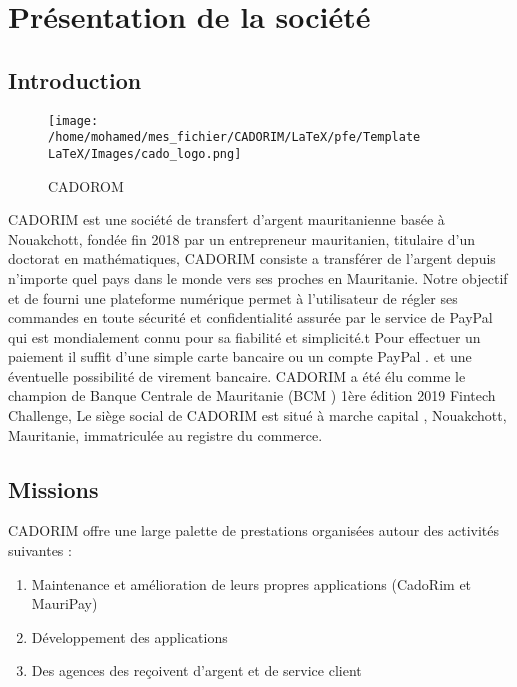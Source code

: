 	\chapter{Présentation de la société}
\label{chap:introduction}
\section{Introduction}
\begin{figure}[h]
	\texttt{[image: /home/mohamed/mes\_fichier/CADORIM/LaTeX/pfe/Template LaTeX/Images/cado\_logo.png]}
	\centering
	\caption{CADOROM}
\end{figure}
CADORIM est une société de transfert d’argent mauritanienne basée à Nouakchott,
fondée fin 2018 par un entrepreneur mauritanien, titulaire d'un doctorat en
mathématiques,
CADORIM consiste a transférer de l’argent depuis n’importe quel pays dans le
monde vers ses proches en Mauritanie. Notre objectif et de fourni une plateforme
numérique permet à l’utilisateur de régler ses commandes en toute sécurité et
confidentialité assurée par le service de PayPal qui est mondialement connu pour sa
fiabilité et simplicité.t Pour effectuer un paiement il suffit d'une simple carte bancaire
ou un compte PayPal . et une éventuelle possibilité de virement bancaire.
CADORIM a été élu comme le champion de Banque Centrale de Mauritanie (BCM )
1ère édition 2019 Fintech Challenge,
Le siège social de CADORIM est situé à marche capital , Nouakchott, Mauritanie,
immatriculée au registre du commerce.
\section{Missions}
CADORIM offre une large palette de prestations organisées autour des activités suivantes :
\begin{enumerate}
	
	\item Maintenance et amélioration de leurs propres applications (CadoRim et MauriPay)
	\item Développement des applications 
	\item Des agences des reçoivent d'argent et de service client
	
\end{enumerate}


